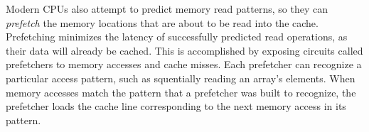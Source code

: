 
Modern CPUs also attempt to predict memory read patterns, so they can
\textit{prefetch} the memory locations that are about to be read into the
cache. Prefetching minimizes the latency of successfully predicted read
operations, as their data will already be cached. This is accomplished by
exposing circuits called prefetchers to memory accesses and cache misses. Each
prefetcher can recognize a particular access pattern, such as squentially
reading an array's elements. When memory accesses match the pattern that a
prefetcher was built to recognize, the prefetcher loads the cache line
corresponding to the next memory access in its pattern.
